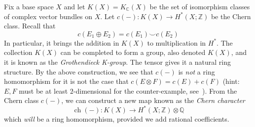 \documentclass{book}
\newcommand{\Q}{{\mathbb{Q}}}
\newcommand{\Z}{{\mathbb{Z}}}
\newcommand{\C}{{\mathbb{C}}}
\newcommand{\ch}{{\operatorname{ch}}}
\renewcommand{\ch}{{\operatorname{ch}}}
\begin{document}
Fix a base space $X$ and let $K(X) = K_\C(X)$ be the set of isomorphism classes of complex vector bundles on
$X$. Let $c(-): K(X) \to H^*(X; \Z)$ be the Chern class. Recall that
\[
  c(E_1\oplus E_2) = c(E_1)\smile c(E_2)
\]
In particular, it brings the addition in $K(X)$ to multiplication in $H^*$. The collection $K(X)$ can be
completed to form a group, also denoted $K(X)$, and it is known as the \emph{Grothendieck K-group}. The tensor
gives it a natural ring structure. By the above construction, we see that $c(-)$ is \emph{not} a ring
homomorphism for it is not the case that $c(E\otimes F) = c(E) + c(F)$ (hint: $E,F$ must be at least
$2$-dimensional for the counter-example, see~\cite{NateKTheory}). From the Chern class $c(-)$, we can construct a new map known as the \emph{Chern character}
\[
  \ch(-): K(X) \to H^*(X; \Z)\otimes \Q
\]
which \emph{will} be a ring homomorphism, provided we add rational coefficients.
\end{document}
